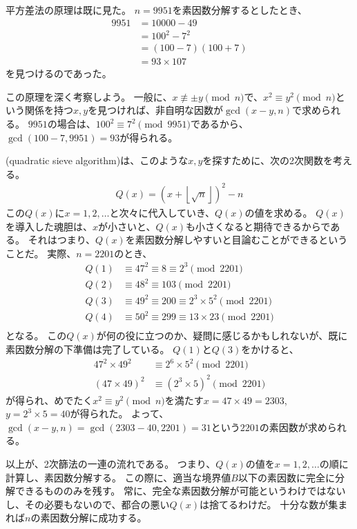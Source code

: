 平方差法の原理は既に見た。
$n=9951$を素因数分解するとしたとき、
\begin{align*}
9951 &= 10000 - 49\\
&= 100^2 - 7^2\\
&= (100 - 7)(100 + 7)\\
&= 93 \times 107
\end{align*}
を見つけるのであった。

この原理を深く考察しよう。
一般に、$x\not\equiv\pm y\pmod{n}$で、$x^2\equiv y^2\pmod{n}$という関係を持つ$x,y$を見つければ、非自明な因数が$\gcd(x-y, n)$で求められる。
$9951$の場合は、$100^2\equiv7^2\pmod{9951}$であるから、$\gcd(100-7, 9951)=93$が得られる。

(quadratic sieve algorithm)は、このような$x,y$を探すために、次の2次関数を考える。
\begin{align*}
Q(x) = (x + \left \lfloor\sqrt{n}\right \rfloor)^2 - n
\end{align*}
この$Q(x)$に$x=1,2,\ldots$と次々に代入していき、$Q(x)$の値を求める。
$Q(x)$を導入した魂胆は、$x$が小さいと、$Q(x)$も小さくなると期待できるからである。
それはつまり、$Q(x)$を素因数分解しやすいと目論むことができるということだ。
実際、$n=2201$のとき、
\begin{align*}
Q(1) &\equiv 47^2 \equiv 8 \equiv 2^3\pmod{2201}\\
Q(2) &\equiv 48^2 \equiv 103 \pmod{2201}\\
Q(3) &\equiv 49^2 \equiv 200 \equiv 2^3 \times 5^2 \pmod{2201}\\
Q(4) &\equiv 50^2 \equiv 299 \equiv 13 \times 23 \pmod{2201}\\
\end{align*}
となる。
この$Q(x)$が何の役に立つのか、疑問に感じるかもしれないが、既に素因数分解の下準備は完了している。
$Q(1)$と$Q(3)$をかけると、
\begin{align*}
47^2 \times 49^2 &\equiv 2^6 \times 5^2 \pmod{2201}\\
(47 \times 49)^2 &\equiv (2^3 \times 5)^2 \pmod{2201}
\end{align*}
が得られ、めでたく$x^2\equiv y^2\pmod{n}$を満たす$x=47\times49=2303$, $y=2^3\times5=40$が得られた。
よって、$\gcd(x-y,n) = \gcd(2303-40, 2201) = 31$という$2201$の素因数が求められる。

以上が、2次篩法の一連の流れである。
つまり、$Q(x)$の値を$x=1,2,\ldots$の順に計算し、素因数分解する。
この際に、適当な境界値$B$以下の素因数に完全に分解できるもののみを残す。
常に、完全な素因数分解が可能というわけではないし、その必要もないので、都合の悪い$Q(x)$は捨てるわけだ。
十分な数が集まれば$n$の素因数分解に成功する。

